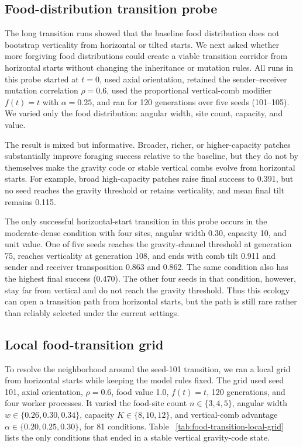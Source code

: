 \documentclass[11pt]{article}
\begin{document}
\subsection{Food-distribution transition probe}

The long transition runs showed that the baseline food distribution does not
bootstrap verticality from horizontal or tilted starts. We next asked whether
more forgiving food distributions could create a viable transition corridor
from horizontal starts without changing the inheritance or mutation rules. All
runs in this probe started at $t=0$, used axial orientation, retained the
sender--receiver mutation correlation $\rho=0.6$, used the proportional
vertical-comb modifier $f(t)=t$ with $\alpha=0.25$, and ran for 120
generations over five seeds (101--105). We varied only the food distribution:
angular width, site count, capacity, and value.



The result is mixed but informative. Broader, richer, or higher-capacity
patches substantially improve foraging success relative to the baseline, but
they do not by themselves make the gravity code or stable vertical combs evolve
from horizontal starts. For example, broad high-capacity patches raise final
success to 0.391, but no seed reaches the gravity threshold or retains
verticality, and mean final tilt remains 0.115.

The only successful horizontal-start transition in this probe occurs in the
moderate-dense condition with four sites, angular width 0.30, capacity 10, and
unit value. One of five seeds reaches the gravity-channel threshold at
generation 75, reaches verticality at generation 108, and ends with comb tilt
0.911 and sender and receiver transposition 0.863 and 0.862. The same condition
also has the highest final success (0.470). The other four seeds in that
condition, however, stay far from vertical and do not reach the gravity
threshold. Thus this ecology can open a transition path from horizontal starts,
but the path is still rare rather than reliably selected under the current
settings.

\subsection{Local food-transition grid}

To resolve the neighborhood around the seed-101 transition, we ran a local
grid from horizontal starts while keeping the model rules fixed. The grid used
seed 101, axial orientation, $\rho=0.6$, food value 1.0, $f(t)=t$, 120
generations, and four worker processes. It varied the food-site count
$n \in \{3,4,5\}$, angular width $w \in \{0.26,0.30,0.34\}$, capacity
$K \in \{8,10,12\}$, and vertical-comb advantage
$\alpha \in \{0.20,0.25,0.30\}$, for 81 conditions. Table~
\ref{tab:food-transition-local-grid} lists the only conditions that ended in
a stable vertical gravity-code state.
\end{document}
